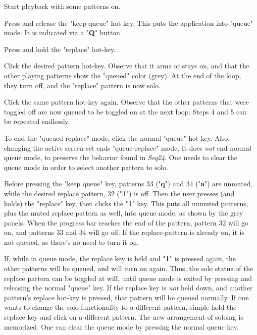    \begin{enumber}
      \item Start playback with some patterns on. 
      \item Press and release
         the "keep queue" hot-key.  This puts the application into "queue" mode.
         It is indicated via a "\textbf{Q}" button.
      \item Press and hold the "replace" hot-key.
      \item Click the desired pattern hot-key.  Observe that it arms or
         stays on, and that the other playing patterns show the "queued" color
         (grey).  At the end of the loop, they turn off, and the "replace"
         pattern is now solo.
      \item Click the same pattern hot-key again.  Observe that the other
         patterns that were toggled off are now queued to be toggled on at the
         next loop.  Steps 4 and 5 can be repeated endlessly.
      \item To end
         the "queued-replace" mode, click the normal "queue"
         hot-key.  Also, changing the active screen-set ends "queue-replace"
         mode.  It does \textsl{not} end normal queue mode, to preserve the
         behavior found in \textsl{Seq24}.
         One needs to clear the queue mode in order to select another pattern
         to solo.
   \end{enumber}


   Before pressing the "keep queue" key, patterns 33 ("\textbf{q}")
   and 34 ("\textbf{a}") are
   unmuted, while the desired replace pattern, 32 ("\textbf{1}") is off.
   Then the user presses (and holds) the "replace" key, then clicks the
   "\textbf{1}" key.
   This puts all unmuted patterns, plus the muted
   replace pattern as well, into queue mode, as shown by the grey panels.
   When the progress bar reaches the end of the pattern, pattern 32 will go on,
   and patterns 33 and 34 will go off.
   If the replace-pattern is already on, it is not queued, as
   there's no need to turn it on.

   If, while in queue mode, the replace key is held and
   "\textbf{1}" is pressed again,
   the other patterns will be queued, and will turn on again.  Thus, the
   solo status of the replace pattern can be toggled at will, until queue mode
   is exited by pressing and releasing the normal "queue" key.
   If the replace key is \textsl{not} held down, and another pattern's replace
   hot-key is pressed, that pattern will be queued normally.
   If one wants to change the solo functionality to a different pattern,
   simple hold the replace key and click on a different pattern.  The new
   arrangement of soloing is memorized.
   One can clear the queue mode by pressing the normal queue key.

